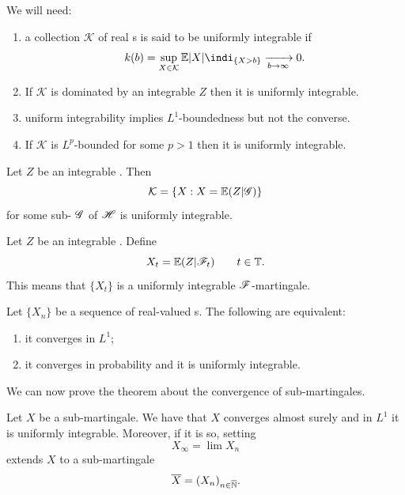 \documentclass{report}
\begin{document}
We will need:
\begin{enumerate}
	\item a collection $\mathcal{K}$ of real \rv s is said to be uniformly integrable if 
	\begin{equation*}
		k(b)=\sup_{X\in\mathcal{K}}\ev|X|\indi_{\{X>b\}}\xrightarrow[b\to\infty]{}0.
	\end{equation*}
	\item If $\mathcal{K}$ is dominated by an integrable \rv{} $Z$ then it is uniformly integrable.
	\item uniform integrability implies $L^{1}$-boundedness but not the converse.
	\item If $\mathcal{K}$ is $L^{p}$-bounded for some $p>1$ then it is uniformly integrable.
\end{enumerate}
\begin{lemma}
	Let $Z$ be an integrable \rv{}. Then
	\begin{equation*}
		\mathcal{K}=\left\{X:X=\mathbb{E}(Z|\mathscr{G})\right\}
	\end{equation*}
	for some sub-\sa{} $\mathscr{G}$ of $\mathscr{H}$ is uniformly integrable.
\end{lemma}
\begin{proposition}
	Let $Z$ be an integrable \rv{}. Define 
	\begin{equation*}
		X_{t}=\mathbb{E}(Z|\mathscr{F}_{t})\qquad t\in\mathbb{T}.
	\end{equation*}
	This means that $\{X_{t}\}$ is a uniformly integrable $\mathscr{F}$-martingale.
\end{proposition}
\begin{theorem}
	Let $\{X_{n}\}$ be a sequence of real-valued \rv s. The following are equivalent:
	\begin{enumerate}
		\item it converges in $L^{1}$;
		\item it converges in probability and it is uniformly integrable.
	\end{enumerate}
\end{theorem}
We can now prove the theorem about the convergence of sub-martingales.
\begin{theorem}
	Let $X$ be a sub-martingale. We have that $X$ converges almost surely and in $L^{1}$ \ifonly{} it is uniformly integrable. Moreover, if it is so, setting 
	\begin{equation*}
		X_{\infty}=\lim X_{n}
	\end{equation*}
	extends $X$ to a sub-martingale
	\begin{equation*}
		\overline{X}={(X_{n})}_{n\in\overline{\mathbb{N}}}.
	\end{equation*}
\end{theorem}
\end{document}
